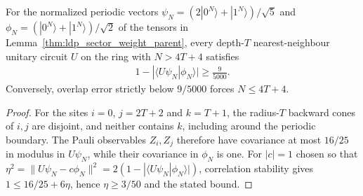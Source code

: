 \begin{lemma}
    \label{thm:ldp_sector_weight_obstruction}
    \leanok
    For the normalized periodic vectors
    $\psi_N=(2|0^N\rangle+|1^N\rangle)/\sqrt5$ and
    $\phi_N=(|0^N\rangle+|1^N\rangle)/\sqrt2$ of the tensors in
    Lemma~\ref{thm:ldp_sector_weight_parent}, every depth-$T$
    nearest-neighbour unitary circuit $U$ on the ring with $N>4T+4$
    satisfies
    \begin{align}
        1-|\langle U\psi_N|\phi_N\rangle|\ge\frac9{5000}.
    \end{align}
    Conversely, overlap error strictly below $9/5000$ forces $N\le4T+4$.
\end{lemma}
\begin{proof}
    \leanok
    For the sites $i=0$, $j=2T+2$ and $k=T+1$, the radius-$T$ backward
    cones of $i,j$ are disjoint, and neither contains $k$, including around
    the periodic boundary. The Pauli observables $Z_i,Z_j$ therefore have
    covariance at most $16/25$ in modulus in $U\psi_N$, while their covariance
    in $\phi_N$ is one. For $|c|=1$ chosen so that
    $\eta^2=\|U\psi_N-c\phi_N\|^2
        =2(1-|\langle U\psi_N|\phi_N\rangle|)$,
    correlation stability gives $1\le16/25+6\eta$, hence
    $\eta\ge3/50$ and the stated bound.
\end{proof}
